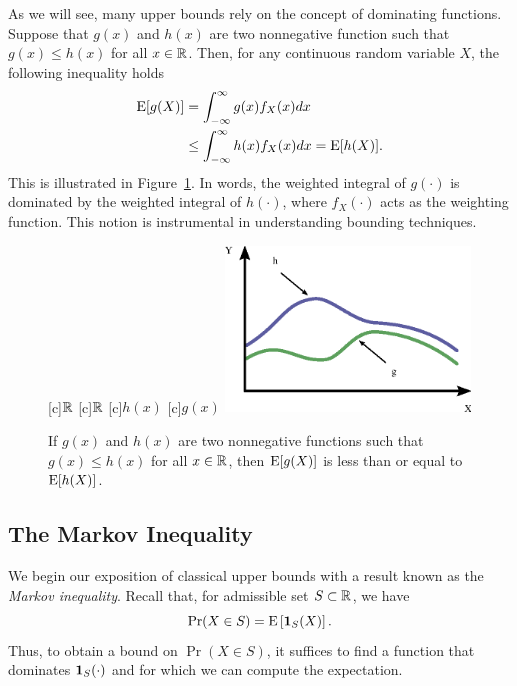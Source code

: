 As we will see, many upper bounds rely on the concept of dominating functions.
Suppose that $g(x)$ and $h(x)$ are two nonnegative function such that $g(x) \leq h(x)$ for all $x \in \mathbb{R}$.
Then, for any continuous random variable $X$, the following inequality holds
\begin{equation*}
\begin{split}
\mathrm{E} [g(X)] &= \int_{-\infty}^{\infty} g(x) f_X(x) dx \\
&\leq \int_{-\infty}^{\infty} h(x) f_X (x) dx
= \mathrm{E} [h(X)] .
\end{split}
\end{equation*}
This is illustrated in Figure~\ref{figure:DominatingFcn}.
In words, the weighted integral of $g(\cdot)$ is dominated by the weighted integral of $h(\cdot)$, where $f_X (\cdot)$ acts as the weighting function.
This notion is instrumental in understanding bounding techniques.
\begin{figure}[thb]
\begin{center}
\begin{psfrags}
[c]{$\mathbb{R}$}
[c]{$\mathbb{R}$}
[c]{$h(x)$}
[c]{$g(x)$}
\includegraphics[width=6.5cm]{Figures/10Chapter/DominatingFcn}
\end{psfrags}
\caption{If $g(x)$ and $h(x)$ are two nonnegative functions such that $g(x) \leq h(x)$ for all $x \in \mathbb{R}$, then $\mathrm{E} [g (X)]$ is less than or equal to $\mathrm{E} [h(X)]$.}
\label{figure:DominatingFcn}
\end{center}
\end{figure}


\subsection{The Markov Inequality}

We begin our exposition of classical upper bounds with a result known as the \emph{Markov inequality}. 
Recall that, for admissible set $S \subset \mathbb{R}$, we have
\begin{equation*}
\Pr (X \in S) = \mathrm{E} \left[ \mathbf{1}_S (X) \right] .
\end{equation*}
Thus, to obtain a bound on $\Pr (X \in S)$, it suffices to find a function that dominates $\mathbf{1}_S (\cdot)$ and for which we can compute the expectation.

